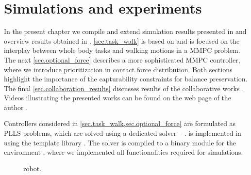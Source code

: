 \chapter{Simulations and experiments}
\label{ch.simulations}
\acresetall

In the present chapter we compile and extend simulation results presented in
\cite{Sherikov2014humanoids, Sherikov2015humanoids} and overview results
obtained in \cite{Brasseur2015humanoids, Agravante2016preprint,
alHomsi2016icra}. \cref{sec.task_walk} is based on \cite{Sherikov2014humanoids}
and is focused on the interplay between whole body tasks and walking motions in
a \ac{MMPC} problem. The next \cref{sec.optional_force} describes a more
sophisticated \ac{MMPC} controller, where we introduce prioritization in
contact force distribution. Both sections highlight the importance of the
capturability constraints for balance preservation. The final
\cref{sec.collaboration_results} discusses results of the collaborative works
\cite{Brasseur2015humanoids, Agravante2016preprint, alHomsi2016icra}. Videos
illustrating the presented works can be found on the web page of the author
\cite{SHERIKOVsite}.


Controllers considered in \cref{sec.task_walk,sec.optional_force} are
formulated as \ac{PLLS} problems, which are solved using a dedicated solver --
 \cite{Dimitrov2015preprint}.  is implemented in 
using the  template library \cite{EIGENsite}. The solver is compiled
to a binary module for the  environment \cite{OCTAVEsite}, where we
implemented all functionalities required for simulations.


\begin{figure}[!hb]
    \begin{minipage}[t]{0.49\textwidth}
        \label{fig.hrp2_side}
    \end{minipage}
    \hfill
    \begin{minipage}[t]{0.49\textwidth}
        \label{fig.hrp2_front}
    \end{minipage}
    \caption{
         robot.
    }
    \label{fig.hrp2}
\end{figure}


